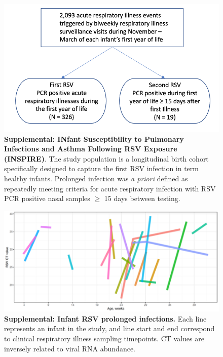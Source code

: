 \documentclass{article} %
\begin{document}
\begin{figure}[ht] \hspace*{0cm}  \begin{center}
        \includegraphics[scale=0.4]{flowchart}
	\caption{\textbf{Supplemental: INfant Susceptibility to Pulmonary Infections and Asthma Following RSV Exposure (INSPIRE)}.
	 The study population is a longitudinal birth cohort specifically designed to capture the first RSV infection in term healthy infants. Prolonged infection was \textit{a priori} defined as repeatedly meeting criteria for acute respiratory infection with RSV PCR positive nasal samples $\ge$ 15 days between testing.}
	\label{fig:1}
 \end{center} \end{figure}


\begin{figure}[ht] \hspace*{0cm}  \begin{center}
    \includegraphics[scale=0.5]{CTvalues}
	\caption{\textbf{Supplemental: Infant RSV prolonged infections.} Each line represents an infant in the study, and line start and end correspond to clinical respiratory illness sampling timepoints. CT values are inversely related to viral RNA abundance.}
	\label{fig:CTvalues}
 \end{center} \end{figure}
 
\end{document}
